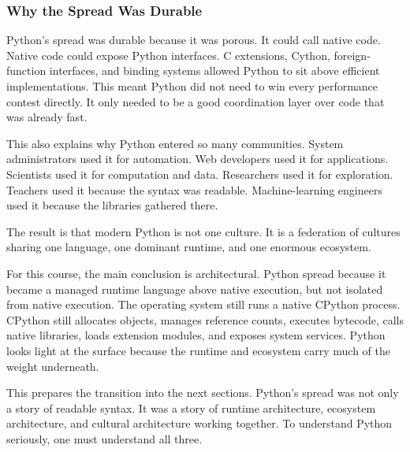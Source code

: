 \subsubsection{Why the Spread Was Durable}

Python's spread was durable because it was porous. It could call native code. Native code could expose Python interfaces. C extensions, Cython, foreign-function interfaces, and binding systems allowed Python to sit above efficient implementations. This meant Python did not need to win every performance contest directly. It only needed to be a good coordination layer over code that was already fast.

This also explains why Python entered so many communities. System administrators used it for automation. Web developers used it for applications. Scientists used it for computation and data. Researchers used it for exploration. Teachers used it because the syntax was readable. Machine-learning engineers used it because the libraries gathered there.

The result is that modern Python is not one culture. It is a federation of cultures sharing one language, one dominant runtime, and one enormous ecosystem.

For this course, the main conclusion is architectural. Python spread because it became a managed runtime language above native execution, but not isolated from native execution. The operating system still runs a native CPython process. CPython still allocates objects, manages reference counts, executes bytecode, calls native libraries, loads extension modules, and exposes system services. Python looks light at the surface because the runtime and ecosystem carry much of the weight underneath.

This prepares the transition into the next sections. Python's spread was not only a story of readable syntax. It was a story of runtime architecture, ecosystem architecture, and cultural architecture working together. To understand Python seriously, one must understand all three.